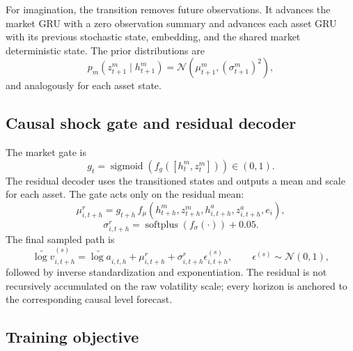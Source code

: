 \documentclass[11pt]{article}
\begin{document}
For imagination, the transition removes future observations. It advances the market GRU with a zero observation summary and advances each asset GRU with its previous stochastic state, embedding, and the shared market deterministic state. The prior distributions are
\begin{equation}
    p_m(z_{t+1}^m\mid h_{t+1}^m)=\mathcal N(\mu_{t+1}^m,(\sigma_{t+1}^m)^2),
\end{equation}
and analogously for each asset state.

\subsection{Causal shock gate and residual decoder}

The market gate is
\begin{equation}
    g_t=\operatorname{sigmoid}(f_g([h_t^m,z_t^m]))\in(0,1).
\end{equation}
The residual decoder uses the transitioned states and outputs a mean and scale for each asset. The gate acts only on the residual mean:
\begin{equation}
    \mu^r_{i,t+h}=g_{t+h}\,f_\mu(h_{t+h}^m,z_{t+h}^m,h_{i,t+h}^a,z_{i,t+h}^a,e_i),
\end{equation}
\begin{equation}
    \sigma^r_{i,t+h}=\operatorname{softplus}(f_\sigma(\cdot))+0.05.
\end{equation}
The final sampled path is
\begin{equation}
    \widetilde{\log v}^{(s)}_{i,t+h}=\widetilde{\log a}_{i,t,h}+\mu^r_{i,t+h}+\sigma^r_{i,t+h}\epsilon^{(s)}_{i,t+h},\qquad \epsilon^{(s)}\sim\mathcal N(0,1),
    \label{eq:forecast}
\end{equation}
followed by inverse standardization and exponentiation. The residual is not recursively accumulated on the raw volatility scale; every horizon is anchored to the corresponding causal level forecast.

\subsection{Training objective}
\end{document}
